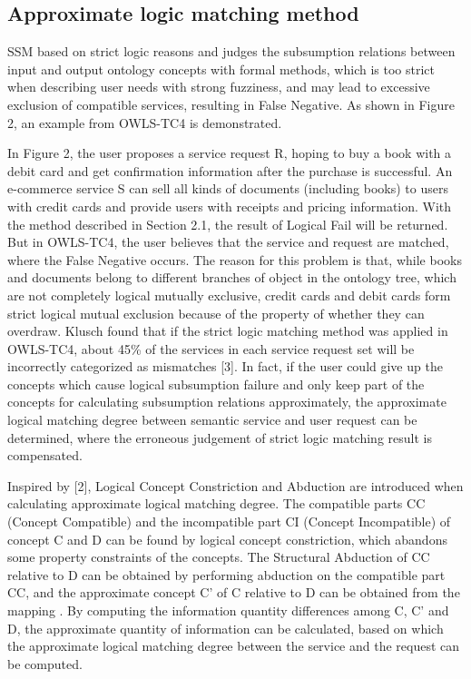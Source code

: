 \documentclass{ieeeaccess}
\begin{document}
\subsection{Approximate logic matching method}
SSM based on strict logic reasons and judges the subsumption relations between input and output ontology concepts with formal methods, which is too strict when describing user needs with strong fuzziness, and may lead to excessive exclusion of compatible services, resulting in False Negative. As shown in Figure 2, an example from OWLS-TC4 is demonstrated.

In Figure 2, the user proposes a service request R, hoping to buy a book with a debit card and get confirmation information after the purchase is successful. An e-commerce service S can sell all kinds of documents (including books) to users with credit cards and provide users with receipts and pricing information. With the method described in Section 2.1, the result of Logical Fail will be returned. But in OWLS-TC4, the user believes that the service and request are matched, where the False Negative occurs. The reason for this problem is that, while books and documents belong to different branches of object in the ontology tree, which are not completely logical mutually exclusive, credit cards and debit cards form strict logical mutual exclusion because of the property of whether they can overdraw. Klusch found that if the strict logic matching method was applied in OWLS-TC4, about 45\% of the services in each service request set will be incorrectly categorized as mismatches [3]. In fact, if the user could give up the concepts which cause logical subsumption failure and only keep part of the concepts for calculating subsumption relations approximately, the approximate logical matching degree between semantic service and user request can be determined, where the erroneous judgement of strict logic matching result is compensated.

Inspired by [2], Logical Concept Constriction and Abduction are introduced when calculating approximate logical matching degree. The compatible parts CC (Concept Compatible) and the incompatible part CI (Concept Incompatible) of concept C and D can be found by logical concept constriction, which abandons some property constraints of the concepts. The Structural Abduction   of CC relative to D can be obtained by performing abduction on the compatible part CC, and the approximate concept C' of C relative to D can be obtained from the mapping  . By computing the information quantity differences among C, C' and D, the approximate quantity of information can be calculated, based on which the approximate logical matching degree between the service and the request can be computed.
\end{document}
